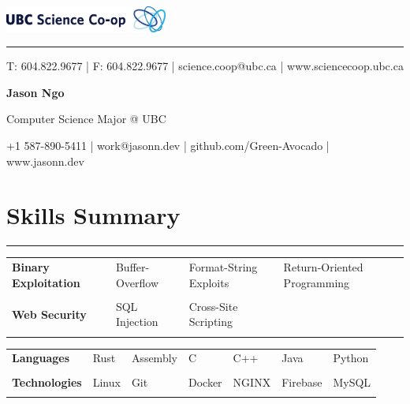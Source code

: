 \documentclass[letterpaper]{article}
\newcommand{\sect}[1]{\section*{#1}
                        {\color{cyan}
                        \rule{\textwidth}{1pt}
                        \vspace{-1ex}}}
\begin{document}
    \begin{flushright}
        \includegraphics[width=0.4\textwidth]{ScienceCo-opLogo_UBC_H.eps}
    \end{flushright}

    \vspace{-2ex}
    \begin{minipage}{\dimexpr(\textwidth-56pt)}
        \begin{flushright}
        {\color{ubclightblue}\rule{\textwidth}{0.5pt}}

        {\small\color{ubcblue}
          T: 604.822.9677
        | F: 604.822.9677
        | science.coop@ubc.ca
        | www.sciencecoop.ubc.ca}
        \end{flushright}
    \end{minipage}

    {\Huge
    \textbf{Jason Ngo}}

    \vspace{1ex}
    {\large
    Computer Science Major @ UBC}

    {\small
      +1 587-890-5411
    | work@jasonn.dev
    | github.com/Green-Avocado
    | www.jasonn.dev
    }
    \vspace{1ex}

    \sect{Skills Summary}

        \begin{tabular}{p{}
                        p{}
                        p{}
                        p{}}
            \textbf{Binary Exploitation} &
                Buffer-Overflow & Format-String Exploits & Return-Oriented Programming \\
                \\
            \textbf{Web Security} &
                SQL Injection & Cross-Site Scripting \\
                \\
        \end{tabular}

        \begin{tabular}{p{}
                        p{}
                        p{}
                        p{}
                        p{}
                        p{}
                        p{}}
            \textbf{Languages} &
                Rust & Assembly & C & C++ & Java & Python \\
                \\
            \textbf{Technologies} &
                Linux & Git & Docker & NGINX & Firebase & MySQL \\
                \\
        \end{tabular}
\end{document}
